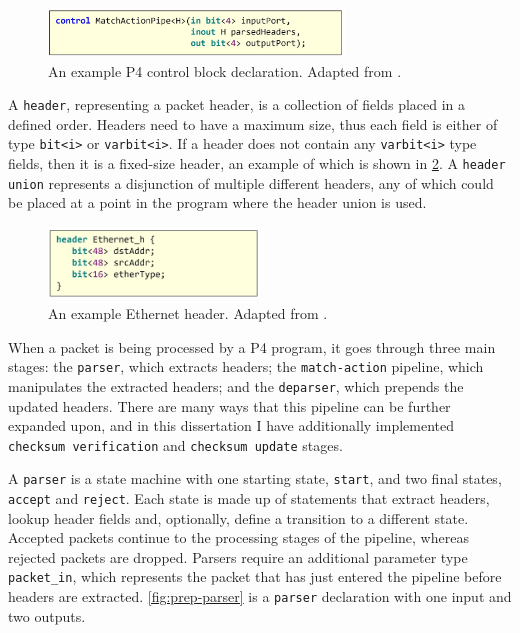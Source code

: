 \begin{figure}[htbp]
  \centering
    \includegraphics[width=0.7\textwidth]{figures/preparation/match_action.jpg}
     \caption{An example P4 control block declaration. Adapted from \cite{P4LangSpecs}.}
     \label{fig:prep-matchaction}
\end{figure}

A \texttt{header}, representing a packet header, is a collection of fields placed in a defined order. Headers need to have a maximum size, thus each field is either of type \texttt{bit<i>} or \texttt{varbit<i>}. If a header does not contain any \texttt{varbit<i>} type fields, then it is a fixed-size header, an example of which is shown in \cref{fig:prep-ethernet}. A \texttt{header union} represents a disjunction of multiple different headers, any of which could be placed at a point in the program where the header union is used.

\begin{figure}[hbtp]
  \centering
    \includegraphics[width=0.5\textwidth]{figures/preparation/ethernet.jpg}
     \caption{An example Ethernet header. Adapted from \cite{P4LangSpecs}.}
     \label{fig:prep-ethernet}
\end{figure}

When a packet is being processed by a P4 program, it goes through three main stages: the \texttt{parser}, which extracts headers; the \texttt{match-action} pipeline, which manipulates the extracted headers; and the \texttt{deparser}, which prepends the updated headers. There are many ways that this pipeline can be further expanded upon, and in this dissertation I have additionally implemented \texttt{checksum verification} and \texttt{checksum update} stages.

A \texttt{parser} is a state machine with one starting state, \texttt{start}, and two final states, \texttt{accept} and \texttt{reject}. Each state is made up of statements that extract headers, lookup header fields and, optionally, define a transition to a different state. Accepted packets continue to the processing stages of the pipeline, whereas rejected packets are dropped. Parsers require an additional parameter type \texttt{packet\_in}, which represents the packet that has just entered the pipeline before headers are extracted. \cref{fig:prep-parser} is a \texttt{parser} declaration with one input and two outputs.

